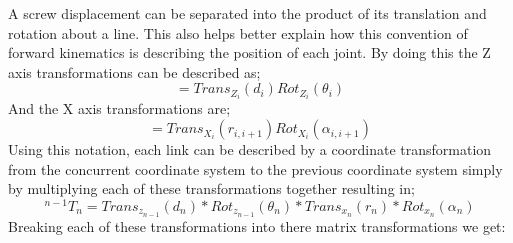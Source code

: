             A screw displacement can be separated into the product of its translation and rotation about a line. This also helps better explain how this convention of forward kinematics is describing the position of each joint. By doing this the Z axis transformations can be described as;
            \begin{equation}
            [Z_i] = Trans_{Z_i}(d_i)Rot_{Z_i}(\theta_i)
            \end{equation}
            And the X axis transformations are;
            \begin{equation}
            [X_i] = Trans_{X_i}(r_{i,i+1})Rot_{X_i}(\alpha_{i,i+1})
            \end{equation}
            Using this notation, each link can be described by a coordinate transformation from the concurrent coordinate system to the previous coordinate system simply by multiplying each of these transformations together resulting in;
            \begin{equation}
            ^{n-1}T_n=Trans_{z_{n-1}}(d_n)*Rot_{z_{n-1}}(\theta_n)*Trans_{x_n}(r_n)*Rot_{x_n}(\alpha_n)
            \end{equation}
            Breaking each of these transformations into there matrix transformations we get:
